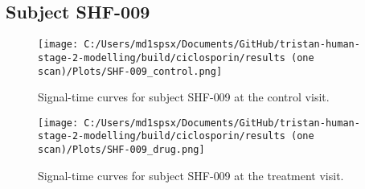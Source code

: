 \documentclass{epflreport}%
\begin{document}
\subsection{Subject SHF{-}009}%
\label{subsec:SubjectSHF{-}009}%

%


\begin{figure}[h!]%
\centering%
\texttt{[image: C:/Users/md1spsx/Documents/GitHub/tristan-human-stage-2-modelling/build/ciclosporin/results (one scan)/Plots/SHF-009\_control.png]}%
\caption{Signal{-}time curves for subject SHF{-}009 at the control visit.}%
\end{figure}

%


\begin{figure}[h!]%
\centering%
\texttt{[image: C:/Users/md1spsx/Documents/GitHub/tristan-human-stage-2-modelling/build/ciclosporin/results (one scan)/Plots/SHF-009\_drug.png]}%
\caption{Signal{-}time curves for subject SHF{-}009 at the treatment visit.}%
\end{figure}
\end{document}
